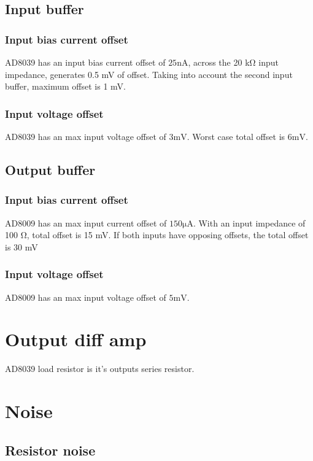 \documentclass[11pt]{article}
\begin{document}
\subsection{Input buffer}
\subsubsection{Input bias current offset}
AD8039 has an input bias current offset of $25 \si{\nano \ampere}$, across the 20 \si{\kilo \ohm}
input impedance, generates 0.5 mV of offset. Taking into account the second input buffer, maximum offset 
is 1 mV.

\subsubsection{Input voltage offset}
AD8039 has an max input voltage offset of $3 \si{\milli \volt}$.
Worst case total offset is $6 \si{\milli \volt}$.

\subsection{Output buffer}
\subsubsection{Input bias current offset}
AD8009 has an max input current offset of $150 \si{\micro \ampere}$. With an input impedance of 
100 \si{\ohm}, total offset is 15 mV. If both inputs have opposing offsets, the total offset is 30 mV

\subsubsection{Input voltage offset}
AD8009 has an max input voltage offset of $5 \si{\milli \volt}$.

\section{Output diff amp}
AD8039 load resistor is it's outputs series resistor. 

\section{Noise}

\subsection{Resistor noise}
\end{document}
